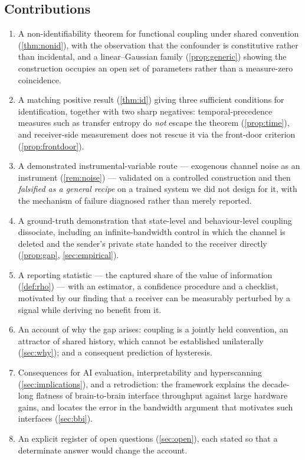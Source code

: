 \documentclass[11pt,a4paper]{article}
\theoremstyle{plain}
\theoremstyle{definition}
\theoremstyle{remark}
\begin{document}
\subsection{Contributions}\label{sec:contributions}

\begin{enumerate}[leftmargin=1.6em, itemsep=3pt]
    \item A non-identifiability theorem for functional coupling under shared convention
    (\cref{thm:nonid}), with the observation that the confounder is constitutive rather than
    incidental, and a linear--Gaussian family (\cref{prop:generic}) showing the construction
    occupies an open set of parameters rather than a measure-zero coincidence.

    \item A matching positive result (\cref{thm:id}) giving three sufficient conditions for
    identification, together with two sharp negatives: temporal-precedence measures such as
    transfer entropy do \emph{not} escape the theorem (\cref{prop:time}), and receiver-side
    measurement does not rescue it via the front-door criterion (\cref{prop:frontdoor}).

    \item A demonstrated instrumental-variable route --- exogenous channel noise as an
    instrument (\cref{rem:noise}) --- validated on a controlled construction and then
    \emph{falsified as a general recipe} on a trained system we did not design for it, with
    the mechanism of failure diagnosed rather than merely reported.

    \item A ground-truth demonstration that state-level and behaviour-level coupling
    dissociate, including an infinite-bandwidth control in which the channel is deleted and
    the sender's private state handed to the receiver directly (\cref{prop:gap},
    \cref{sec:empirical}).

    \item A reporting statistic --- the captured share of the value of information
    (\cref{def:rho}) --- with an estimator, a confidence procedure and a checklist, motivated
    by our finding that a receiver can be measurably perturbed by a signal while deriving no
    benefit from it.

    \item An account of why the gap arises: coupling is a jointly held convention, an
    attractor of shared history, which cannot be established unilaterally
    (\cref{sec:why}); and a consequent prediction of hysteresis.

    \item Consequences for AI evaluation, interpretability and hyperscanning
    (\cref{sec:implications}), and a retrodiction: the framework explains the decade-long
    flatness of brain-to-brain interface throughput against large hardware gains, and
    locates the error in the bandwidth argument that motivates such interfaces
    (\cref{sec:bbi}).

    \item An explicit register of open questions (\cref{sec:open}), each stated so that a
    determinate answer would change the account.
\end{enumerate}
\end{document}
